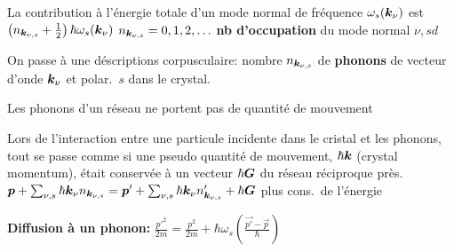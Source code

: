 \begin{squishlist}
    \item La contribution à l'énergie totale d'un mode normal de fréquence $\omega_s(\bm{k}_{\nu})$ est $\left( n_{\bm{k}_{\nu,s}} + \frac{1}{2}\right) \hbar \omega_s(\bm{k}_{\nu})$ \qquad $n_{\bm{k}_{\nu,s}} = 0,1,2,\ldots$ \textbf{nb d'occupation} du mode normal $\nu,sd$
    \item On passe à une déscriptions corpusculaire: nombre $n_{\bm{k}_{\nu,s}}$ de \textbf{phonons} de vecteur d'onde $\bm{k}_{\nu}$ et polar.\ $s$ dans le crystal.
    \item Les phonons d'un réseau ne portent pas de quantité de mouvement
    \item Lors de l’interaction entre une particule incidente dans le cristal et les phonons, tout se passe comme si une pseudo quantité de mouvement, $\hbar \bm{k}$ (crystal momentum), était conservée à un vecteur $\hbar \bm{G}$ du réseau réciproque près. \\
    $\bm{p} + \sum_{\nu,s}\hbar \bm{k}_{\nu}n_{\bm{k}_{\nu,s}} = \bm{p}' + \sum_{\nu,s}\hbar \bm{k}_{\nu}n'_{\bm{k}_{\nu,s}} + \hbar \bm{G}$ \quad plus cons.\ de l'énergie

    \item \textbf{Diffusion à un phonon:} $\frac{p'^2}{2m} = \frac{p^2}{2m} + \hbar \omega_s \left( \frac{\vec{p'}-\vec{p}}{\hbar}\right)$
    
\end{squishlist}

